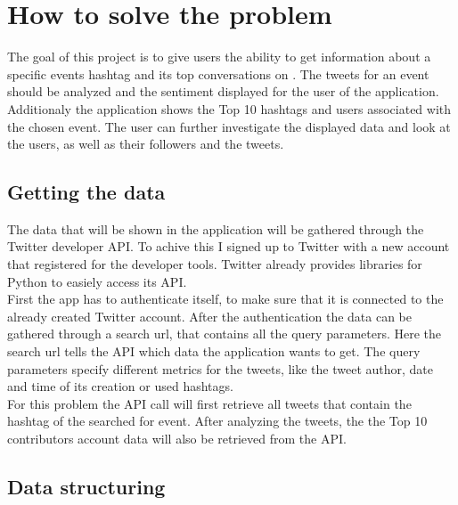\documentclass[a4paper,oneside,11pt]{scrreprt}
\begin{document}



\newpage


\chapter{How to solve the problem}

The goal of this project is to give users the ability to get information about a specific events hashtag and its top conversations on . The tweets for an event should be analyzed and the sentiment displayed for the user of the application. Additionaly the application shows the Top 10 hashtags and users associated with the chosen event. The user can further investigate the displayed data and look at the users, as well as their followers and the tweets.

\section{Getting the data}

The data that will be shown in the application will be gathered through the Twitter developer API. To achive this I signed up to Twitter with a new account that registered for the developer tools. Twitter already provides libraries for Python to easiely access its API.\\

First the app has to authenticate itself, to make sure that it is connected to the already created Twitter account. After the authentication the data can be gathered through a search url, that contains all the query parameters. Here the search url tells the API which data the application wants to get. The query parameters specify different metrics for the tweets, like the tweet author, date and time of its creation or used hashtags.\\

For this problem the API call will first retrieve all tweets that contain the hashtag of the searched for event. After analyzing the tweets, the the Top 10 contributors account data will also be retrieved from the API. 

\section{Data structuring}
\end{document}
